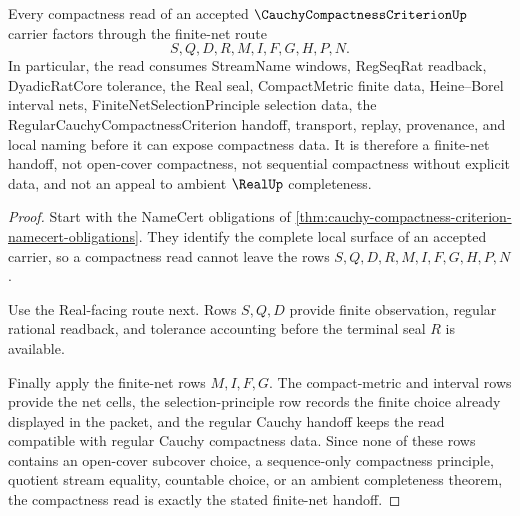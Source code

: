 \begin{theorem}
\label{thm:cauchy-compactness-criterion-finite-net-handoff}
Every compactness read of an accepted $\CauchyCompactnessCriterionUp$ carrier factors through the finite-net route
$$
S,Q,D,R,M,I,F,G,H,P,N .
$$
In particular, the read consumes StreamName windows, RegSeqRat readback, DyadicRatCore tolerance, the Real seal, CompactMetric finite data, Heine--Borel interval nets, FiniteNetSelectionPrinciple selection data, the RegularCauchyCompactnessCriterion handoff, transport, replay, provenance, and local naming before it can expose compactness data. It is therefore a finite-net handoff, not open-cover compactness, not sequential compactness without explicit data, and not an appeal to ambient $\RealUp$ completeness.
\end{theorem}
\begin{proof}
Start with the NameCert obligations of \autoref{thm:cauchy-compactness-criterion-namecert-obligations}. They identify the complete local surface of an accepted carrier, so a compactness read cannot leave the rows $S,Q,D,R,M,I,F,G,H,P,N$.

Use the Real-facing route next. Rows $S,Q,D$ provide finite observation, regular rational readback, and tolerance accounting before the terminal seal $R$ is available.

Finally apply the finite-net rows $M,I,F,G$. The compact-metric and interval rows provide the net cells, the selection-principle row records the finite choice already displayed in the packet, and the regular Cauchy handoff keeps the read compatible with regular Cauchy compactness data. Since none of these rows contains an open-cover subcover choice, a sequence-only compactness principle, quotient stream equality, countable choice, or an ambient completeness theorem, the compactness read is exactly the stated finite-net handoff.
\end{proof}



